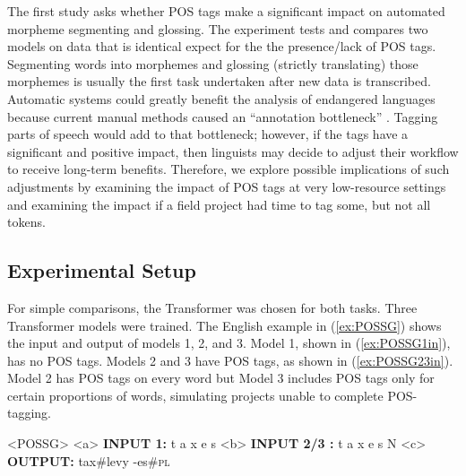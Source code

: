 The first study asks whether POS tags make a significant impact on automated morpheme segmenting and glossing. The experiment tests and compares two models on data that is identical expect for the the presence/lack of POS tags. Segmenting words into morphemes and glossing (strictly translating) those morphemes is usually the first task undertaken after new data is transcribed. Automatic systems could greatly benefit the analysis of endangered languages because current manual methods caused an ``annotation bottleneck'' \citep{simons_worlds_2013,holton_developing_2017,seifart_language_2018}. Tagging parts of speech would add to that bottleneck; however, if the tags have a significant and positive impact, then linguists may decide to adjust their workflow to receive long-term benefits. Therefore, we explore possible implications of such adjustments by examining the impact of POS tags at very low-resource settings and examining the impact if a field project had time to tag some, but not all tokens. 

\subsection{Experimental Setup}
\label{sec:segglssetup}

For simple comparisons, the Transformer was chosen for both tasks. Three Transformer models were trained. The English example in (\ref{ex:POSSG}) shows the input and output of models 1, 2, and 3. Model 1, shown in (\ref{ex:POSSG1in}), has no POS tags. Models 2 and 3 have POS tags, as shown in (\ref{ex:POSSG23in}). Model 2 has POS tags on every word but Model 3 includes POS tags only for certain proportions of words, simulating projects unable to complete POS-tagging.

\pex<POSSG>   
\label{ex:POSSG}
\a<a> \textbf{INPUT 1:} \hspace{2 mm} t \hspace{2 mm} a \hspace{2 mm} x \hspace{2 mm} e \hspace{2 mm} s 
\label{ex:POSSG1in}
\a<b> \textbf{INPUT 2/3 :} \hspace{2 mm} t \hspace{2 mm} a \hspace{2 mm} x \hspace{2 mm} e \hspace{2 mm} s \hspace{2 mm} N
\label{ex:POSSG23in}
\a<c> \textbf{OUTPUT:} \hspace{2 mm} tax\#levy \hspace{2mm} -es\#\textsc{pl}
\label{ex:POSSGout}
\xe


